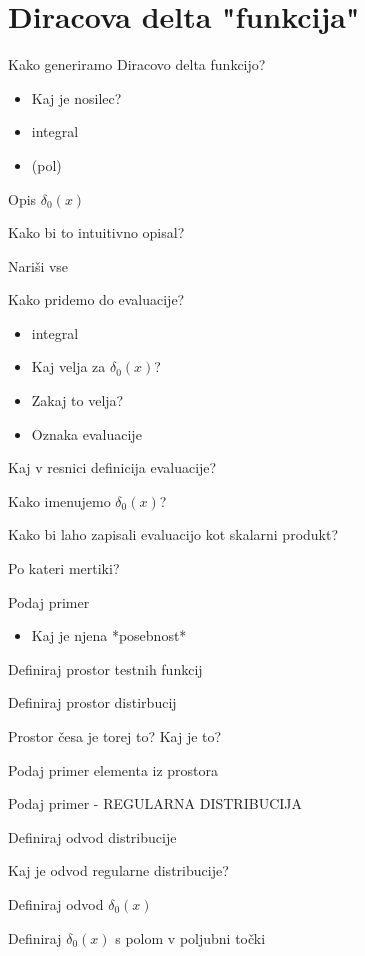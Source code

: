 \documentclass{article}
\begin{document}
    \section{Diracova delta "funkcija"}
    \begin{enumerate}
        {\color{red}\item Kako generiramo Diracovo delta funkcijo? }
        {\color{red}\begin{itemize}
            \item Kaj je nosilec?
            \item integral
            \item (pol)
        \end{itemize}}
        \item Opis $\delta_0 (x)$
        \item Kako bi to intuitivno opisal? 
        \item Nariši vse
        {\color{red}\item Kako pridemo do evaluacije?}
        {\color{red}\begin{itemize}
            \item integral
            \item Kaj velja za  $\delta_0 (x)$?
            \item Zakaj to velja?
            \item Oznaka evaluacije
        \end{itemize}}
        {\color{red}\item Kaj v resnici definicija evaluacije?}
        {\color{red}\item Kako imenujemo  $\delta_0 (x)$?}
        {\color{red}\item Kako bi laho zapisali evaluacijo kot skalarni produkt?}
        \item Po kateri mertiki?
        {\color{red}\item Podaj primer}
        {\color{red}\begin{itemize}
            \item Kaj je njena *posebnost*
        \end{itemize}}
        {\color{red}\item Definiraj prostor testnih funkcij}
        \item Definiraj prostor distirbucij
        \item Prostor česa je torej to? Kaj je to?
        {\color{red}\item Podaj primer elementa iz prostora }
        {\color{red}\item Podaj primer - REGULARNA DISTRIBUCIJA}
        {\color{red}\item Definiraj odvod distribucije }
        \item Kaj je odvod regularne distribucije? 
        {\color{red}\item Definiraj odvod  $\delta_0 (x)$}
        {\color{red}\item Definiraj  $\delta_0 (x)$ s polom v poljubni točki}
    \end{enumerate}
\end{document}
